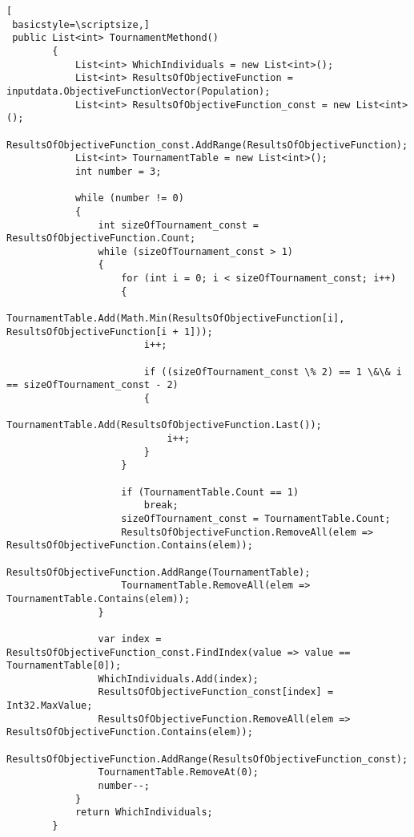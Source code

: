 \begin{program}
\begin{lstlisting}[
 basicstyle=\scriptsize,]
 public List<int> TournamentMethond()
        {
            List<int> WhichIndividuals = new List<int>();
            List<int> ResultsOfObjectiveFunction = inputdata.ObjectiveFunctionVector(Population);
            List<int> ResultsOfObjectiveFunction_const = new List<int>();
            ResultsOfObjectiveFunction_const.AddRange(ResultsOfObjectiveFunction);
            List<int> TournamentTable = new List<int>();
            int number = 3;

            while (number != 0)
            {
                int sizeOfTournament_const = ResultsOfObjectiveFunction.Count;
                while (sizeOfTournament_const > 1)
                {
                    for (int i = 0; i < sizeOfTournament_const; i++)
                    {
                        TournamentTable.Add(Math.Min(ResultsOfObjectiveFunction[i], ResultsOfObjectiveFunction[i + 1]));
                        i++;

                        if ((sizeOfTournament_const \% 2) == 1 \&\& i == sizeOfTournament_const - 2)
                        {
                            TournamentTable.Add(ResultsOfObjectiveFunction.Last());
                            i++;
                        }
                    }

                    if (TournamentTable.Count == 1)
                        break;
                    sizeOfTournament_const = TournamentTable.Count;
                    ResultsOfObjectiveFunction.RemoveAll(elem => ResultsOfObjectiveFunction.Contains(elem));
                    ResultsOfObjectiveFunction.AddRange(TournamentTable);
                    TournamentTable.RemoveAll(elem => TournamentTable.Contains(elem));
                }

                var index = ResultsOfObjectiveFunction_const.FindIndex(value => value == TournamentTable[0]);
                WhichIndividuals.Add(index);
                ResultsOfObjectiveFunction_const[index] = Int32.MaxValue;
                ResultsOfObjectiveFunction.RemoveAll(elem => ResultsOfObjectiveFunction.Contains(elem));
                ResultsOfObjectiveFunction.AddRange(ResultsOfObjectiveFunction_const);
                TournamentTable.RemoveAt(0);
                number--;
            }
            return WhichIndividuals;
        }
\end{lstlisting}
\end{program}

